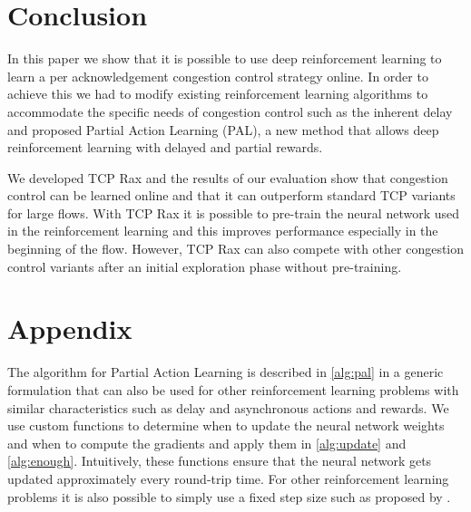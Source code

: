 \documentclass[10pt,sigconf,anonymous]{acmart}
\begin{document}
\section{Conclusion}


In this paper we show that it is possible to use deep reinforcement learning to learn a per acknowledgement congestion control strategy online. In order to achieve this we had to modify existing reinforcement learning algorithms to accommodate the specific needs of congestion control such as the inherent delay and proposed Partial Action Learning (PAL), a new method that allows deep reinforcement learning with delayed and partial rewards.

We developed TCP Rax and the results of our evaluation show that congestion control can be learned online and that it can outperform standard TCP variants for large flows. With TCP Rax it is possible to pre-train the neural network used in the reinforcement learning and this improves performance especially in the beginning of the flow. However, TCP Rax can also compete with other congestion control variants after an initial exploration phase without pre-training.

\section*{Appendix}	

The algorithm for Partial Action Learning is described in \autoref{alg:pal} in a generic formulation that can also be used for other reinforcement learning problems with similar characteristics such as delay and asynchronous actions and rewards. We use custom functions to determine when to update the neural network weights and when to compute the gradients and apply them in \autoref{alg:update} and \autoref{alg:enough}. Intuitively, these functions ensure that the neural network gets updated approximately every round-trip time. For other reinforcement learning problems it is also possible to simply use a fixed step size such as proposed by \cite{mnih_asynchronous_2016}.
\end{document}
